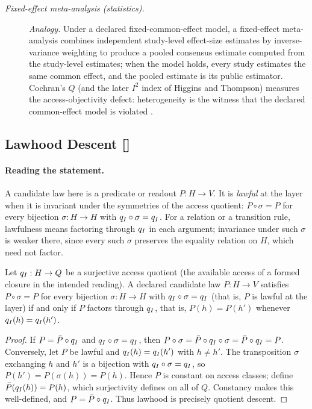 \begingroup\small
\begin{description}
\item[\emph{Fixed-effect meta-analysis (statistics).}] \textit{Analogy.}
Under a declared fixed-common-effect model, a fixed-effect
meta-analysis combines independent study-level effect-size
estimates by inverse-variance weighting to produce a pooled
consensus estimate computed from the study-level estimates; when the
model holds, every study estimates the same common effect, and the
pooled estimate is its public estimator.  Cochran's \(Q\) (and the later \(I^2\) index of Higgins and Thompson) measures the
 access-objectivity defect: heterogeneity is the witness that
the declared common-effect model is violated
\citep{HedgesOlkin1985MetaAnalysis}.

\end{description}
\endgroup


\subsection{Lawhood Descent [\texorpdfstring{}{F18}]}\label{sec:status-records-coherence:lawhood-descent}

\paragraph{Reading the statement.}
A candidate law here is a predicate or readout \(P:H\to V\). It is
\emph{lawful} at the layer when it is invariant under the symmetries of the
access quotient: \(P\circ\sigma=P\) for every bijection \(\sigma:H\to H\)
with \(q_I\circ\sigma=q_I\). For a relation or a transition rule,
lawfulness means factoring through \(q_I\) in each argument; invariance
under such \(\sigma\) is weaker there, since every such \(\sigma\) preserves
the equality relation on \(H\), which need not factor.

\begin{theorem}\label{thm:F18}
Let \(q_I:H\to Q\) be a surjective access quotient (the available access of
a formed closure in the intended reading).  A declared candidate law \(P:H\to V\) satisfies \(P\circ\sigma=P\) for
every bijection \(\sigma:H\to H\) with \(q_I\circ\sigma=q_I\) (that is,
\(P\) is lawful at the layer) if and only if \(P\) factors through \(q_I\),
that is, \(P(h)=P(h')\) whenever \(q_I(h)=q_I(h')\).
\end{theorem}
\begin{proof}
If \(P=\bar P\circ q_I\) and \(q_I\circ\sigma=q_I\), then
\(P\circ\sigma=\bar P\circ q_I\circ\sigma=\bar P\circ q_I=P\).
Conversely, let \(P\) be lawful and \(q_I(h)=q_I(h')\) with
\(h\ne h'\). The transposition \(\sigma\) exchanging \(h\) and \(h'\) is a
bijection with \(q_I\circ\sigma=q_I\), so
\(P(h')=P(\sigma(h))=P(h)\). Hence \(P\) is constant on access classes;
define \(\bar P(q_I(h))=P(h)\), which surjectivity defines on all of
\(Q\).  Constancy makes this well-defined, and
\(P=\bar P\circ q_I\).  Thus lawhood is precisely quotient descent.
\end{proof}

